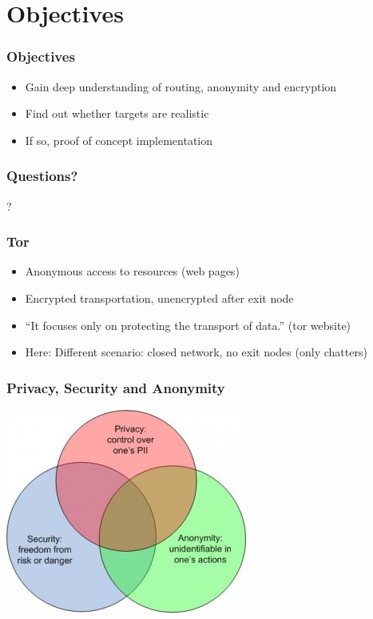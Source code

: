 \documentclass{beamer}
\begin{document}
\section{Objectives}
\frame
{
  \frametitle{Objectives}
  \begin{itemize}
    \item Gain deep understanding of routing, anonymity and encryption
    \item Find out whether targets are realistic
    \item If so, \pause proof of concept implementation
  \end{itemize}
}

\frame
{
  \frametitle{Questions?}
  \begin{center}
  ?
  \end{center}
}

\frame
{
  \frametitle{Tor}
  \begin{itemize}
    \item Anonymous access to resources (web pages)
    \item Encrypted transportation, unencrypted after exit node
    \item "`It focuses only on protecting the transport of data."' (tor website)
    \item Here: Different scenario: closed network, no exit nodes (only chatters)
  \end{itemize}
}

\frame
{
  \frametitle{Privacy, Security and Anonymity}
    \begin{center}
    \includegraphics[scale=0.5]{privacy-security-anon1-300x253.jpg}
    \end{center}
}
\end{document}
